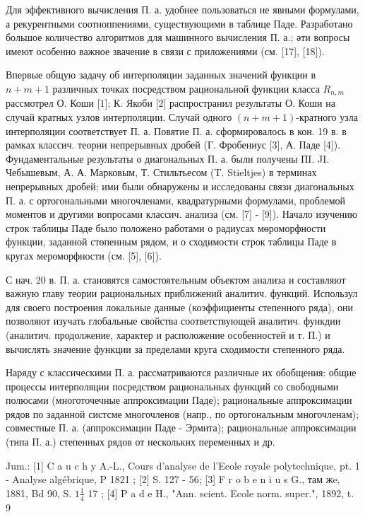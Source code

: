 \documentclass[10pt]{article}
\begin{document}
Для эффективного вычисления П. а. удобнее пользоваться не явными формулами, а рекурентными соотноппениями, существующими в таблице Паде. Разработано большое количество алгоритмов для машинного вычисления П. а.; әти вопросы имеют особенно важное звачение в связи с приложениями (см. [17], [18]).



Впервые общую задачу об интерполяции заданных значений функции в $n+m+1$ различных точках посредством рациональной функции класса $R_{n, m}$ рассмотрел О. Коши [1]; К. Якоби [2] распространил результаты $О$. Коши на случай кратных узлов интерполяции. Случай одного $(n+m+1)$-кратного узла интерполяции соответствует П. а. Повятие П. а. сформировалось в кон. 19 в. в рамках классич. теории непрерывных дробей (Г. Фробениус [3], А. Паде [4]). Фундаментальные результаты о диагональных П. а. были получены ПI. JI. Чебышевым, А. А. Марковым, Т. Стильтьесом (T. Stieltjes) в терминах непрерывных дробей; ими были обнаружены и исследованы связи диагональных П. а. с ортогональными многочленами, квадратурными формулами, проблемой моментов и другими вопросами классич. анализа (см. [7] - [9]). Начало изучению строк таблицы Паде было положено работами о радиусах мөроморфности функции, заданной стөпенным рядом, и о сходимости строк таблицы Паде в кругах мероморфности (см. [5], [6]).



С нач. 20 в. П. а. становятся самостоятельным объектом анализа и составляют важную главу теории рациональных приближений аналитич. функций. Использул для своего построения локальные данные (коэффициенты степенного ряда), они позволяют изучать глобальные свойства соответствующей аналитич. функдии (аналитич. продолжение, характер и расположение особенностей и т. П.) и вычислять значение функции за пределами круга сходимости степенного ряда.



Наряду с классическими П. а. рассматриваются различные их обобщения: общие процессы интерполяции посредством рациональных функций со свободными полюсами (многоточечные аппроксимации Паде); рациональные аппроксимации рядов по заданной систсме многочленов (напр., по ортогональным многочленам); совместные П. а. (аппроксимации Паде - Эрмита); рациональные аппроксимации (типа П. а.) степенных рядов от нескольких переменных и др.



Jum.: [1] C a u c h y A.-L., Cours d'analyse de l'Ecole royale polytechnique, pt. 1 - Analyse algébrique, P 1821 ; [2] S. 127 - 56; [3] F r o b e n i u s G., там жe, 1881, Bd 90, S. $1 \frac{1}{4}$ 17 ; [4] P a d e H., "Ann. scient. Ecole norm. super.", 1892, t. 9
\end{document}
